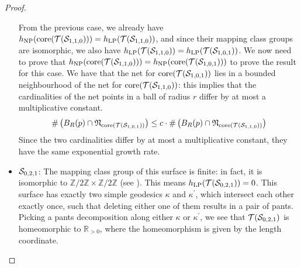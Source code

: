 \documentclass[12pt, reqno]{amsart}
\begin{document}
\begin{proof}
\begin{itemize}
    From the previous case, we already have $h_{\mathrm{NP}}(\mathrm{core}(\mathcal{T}(\mathcal{S}_{1,1,0}))) = h_{\mathrm{LP}}(\mathcal{T}(\mathcal{S}_{1,1,0}))$, and since their mapping class groups are isomorphic, we also have $h_{\mathrm{LP}}(\mathcal{T}(\mathcal{S}_{1,1,0})) = h_{\mathrm{LP}}(\mathcal{T}(\mathcal{S}_{1,0,1}))$.
    We now need to prove that $h_{\mathrm{NP}}(\mathrm{core}(\mathcal{T}(\mathcal{S}_{1,1,0}))) = h_{\mathrm{NP}}(\mathrm{core}(\mathcal{T}(\mathcal{S}_{1,0,1})))$ to prove the result for this case.
    We have that the net for $\mathrm{core}(\mathcal{T}(\mathcal{S}_{1,0,1}))$ lies in a bounded neighbourhood of the net for $\mathrm{core}(\mathcal{T}(\mathcal{S}_{1,1,0}))$: this implies that the cardinalities of the net points in a ball of radius $r$ differ by at most a multiplicative constant.
    \begin{align*}
      \#\left( B_R(p) \cap \mathfrak{N}_{\mathrm{core}(\mathcal{T}(\mathcal{S}_{1,0,1}))} \right) \leq c \cdot \#\left( B_R(p) \cap \mathfrak{N}_{\mathrm{core}(\mathcal{T}(\mathcal{S}_{1,1,0}))} \right)
    \end{align*}
    Since the two cardinalities differ by at most a multiplicative constant, they have the same exponential growth rate.
  \item $\mathcal{S}_{0,2,1}$: The mapping class group of this surface is finite: in fact, it is isomorphic to $\mathbb{Z}/2\mathbb{Z} \times \mathbb{Z}/2\mathbb{Z}$ (see \textcite{gendulphe2017whats}).
    This means $h_{\mathrm{LP}}(\mathcal{T}(\mathcal{S}_{0,2,1})) = 0$.
    This surface has exactly two simple geodesics $\kappa$ and $\kappa^{\prime}$, which intersect each other exactly once, such that deleting either one of them results in a pair of pants.
    Picking a pants decomposition along either $\kappa$ or $\kappa^{\prime}$, we see that $\mathcal{T}(\mathcal{S}_{0,2,1})$ is homeomorphic to $\mathbb{R}_{>0}$, where the homeomorphism is given by the length coordinate.


\end{itemize}
\end{proof}
\end{document}
